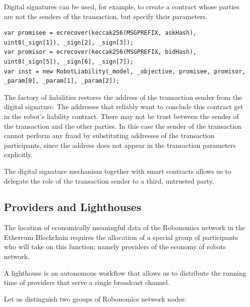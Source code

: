 \documentclass{article}
\begin{document}
Digital signatures can be used, for example, to create a contract whose parties are not the senders of the transaction, but specify their parameters.

\begin{lstlisting}
var promisee = ecrecover(keccak256(MSGPREFIX, askHash), uint8(_sign[1]), _sign[2], _sign[3]);
var promisor = ecrecover(keccak256(MSGPREFIX, bidHash), uint8(_sign[5]), _sign[6], _sign[7]);
var inst = new RobotLiability(_model, _objective, promisee, promisor, _param[0], _param[1], _param[2]);
\end{lstlisting}

The factory of liabilities restores the address of the transaction sender from the digital signature. The addresses that reliably want to conclude this contract get in the robot’s liability contract. There may not be trust between the sender of the transaction and the other parties. In this case the sender of the transaction cannot perform any fraud by substituting addresses of the transaction participants, since the address does not appear in the transaction parameters explicitly.

The digital signature mechanism together with smart contracts allows us to delegate the role of the transaction sender to a third, untrusted party.

\subsection{Providers and Lighthouses}

The location of economically meaningful data of the Robonomics network in the Ethereum Blockchain requires the allocation of a special group of participants who will take on this function; namely providers of the economy of robots network.

A lighthouse is an autonomous workflow that allows us to distribute the running time of providers that serve a single broadcast channel.

Let us distinguish two groups of Robonomics network nodes:
\end{document}
